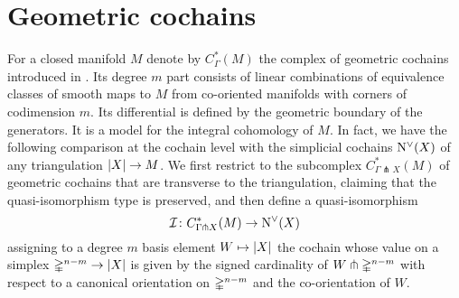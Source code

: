 
\section*{Geometric cochains}

For a closed manifold $M$ denote by $C^*_{\Gamma}(M)$ the complex of geometric cochains introduced in \cite{medina2021flowing}.
Its degree $m$ part consists of linear combinations of equivalence classes of smooth maps to $M$ from co-oriented manifolds with corners of codimension $m$.
Its differential is defined by the geometric boundary of the generators.
It is a model for the integral cohomology of $M$.
In fact, we have the following comparison at the cochain level with the simplicial cochains $\operatorname{N^{\vee}}(X)$ of any triangulation $\lvert X\rvert \to M$.
We first restrict to the subcomplex $C^*_{\Gamma \pitchfork X}(M)$ of geometric cochains that are transverse to the triangulation, claiming that the quasi-isomorphism type is preserved, and then define a quasi-isomorphism
\[
\mathcal{I} \colon C^*_{\Gamma \pitchfork X}(M) \to \operatorname{N^{\vee}}(X)
\]
assigning to a degree $m$ basis element $W \mapsto \lvert X\rvert$ the cochain whose value on a simplex $\mathbb{\Delta}^{n-m} \to \lvert X\rvert$ is given by the signed cardinality of $W \pitchfork \mathbb{\Delta}^{n-m}$ with respect to a canonical orientation on $\mathbb{\Delta}^{n-m}$ and the co-orientation of $W$.